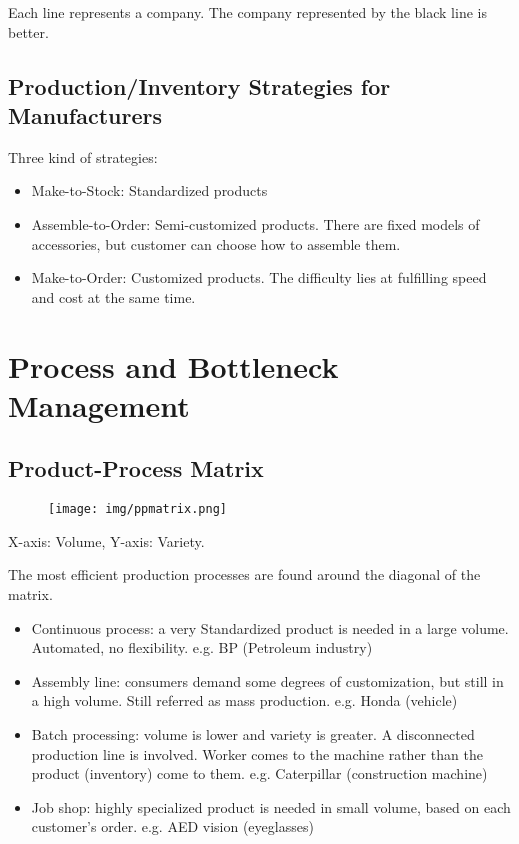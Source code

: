 \documentclass{article}
\begin{document}
Each line represents a company. The company represented by the black line is better.

\subsection{Production/Inventory Strategies for Manufacturers}

Three kind of strategies:

\begin{itemize}
	\item Make-to-Stock: Standardized products
	\item Assemble-to-Order: Semi-customized products.
	      There are fixed models of accessories, but customer can choose how to assemble them.
	\item Make-to-Order: Customized products.
	      The difficulty lies at fulfilling speed and cost at the same time.
\end{itemize}


\section{Process and Bottleneck Management}

\subsection{Product-Process Matrix}

\begin{figure}[H]
	\centering
	\texttt{[image: img/ppmatrix.png]}
\end{figure}

X-axis: Volume, Y-axis: Variety.

The most efficient production processes are found around the diagonal of the matrix.


\begin{itemize}
	\item Continuous process: a very Standardized product is needed in a large volume.
	      Automated, no flexibility. e.g. BP (Petroleum industry)
	\item Assembly line: consumers demand some degrees of customization, but still in a high volume.
	      Still referred as mass production. e.g. Honda (vehicle)
	\item Batch processing: volume is lower and variety is greater.
	      A disconnected production line is involved.
	      Worker comes to the machine rather than the product (inventory) come to them.
	      e.g. Caterpillar (construction machine)
	\item Job shop: highly specialized product is needed in small volume, based on each customer's order.
	      e.g. AED vision (eyeglasses)
\end{itemize}
\end{document}

